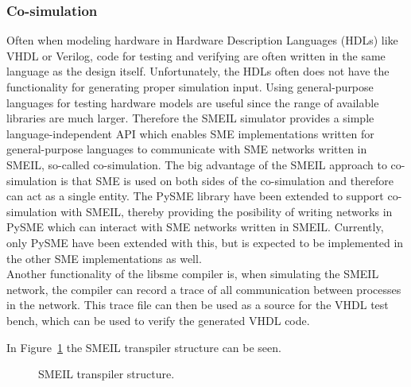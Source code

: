 \subsubsection{Co-simulation}
Often when modeling hardware in Hardware Description Languages (HDLs) like VHDL or Verilog, code for testing and verifying are often written in the same language as the design itself. Unfortunately, the HDLs often does not have the functionality for generating proper simulation input. Using general-purpose languages for testing hardware models are useful since the range of available libraries are much larger.
Therefore the SMEIL simulator provides a simple language-independent API which enables SME implementations written for general-purpose languages to communicate with SME networks written in SMEIL, so-called co-simulation.
The big advantage of the SMEIL approach to co-simulation is that SME is used on both sides of the co-simulation and therefore can act as a single entity.
The PySME %
library have been extended to support co-simulation with SMEIL, thereby providing the posibility of writing networks in PySME which can interact with SME networks written in SMEIL. Currently, only PySME have been extended with this, but is expected to be implemented in the other SME implementations as well.\\
Another functionality of the libsme compiler is, when simulating the SMEIL network, the compiler can record a trace of all communication between processes in the network. This trace file can then be used as a source for the VHDL test bench, which can be used to verify the generated VHDL code.

In Figure~\ref{fig:smeil_transpiler} the SMEIL transpiler structure can be seen.

\begin{figure}[!ht]
  \centering
  \caption{SMEIL transpiler structure.}
  \label{fig:smeil_transpiler}
\end{figure}
